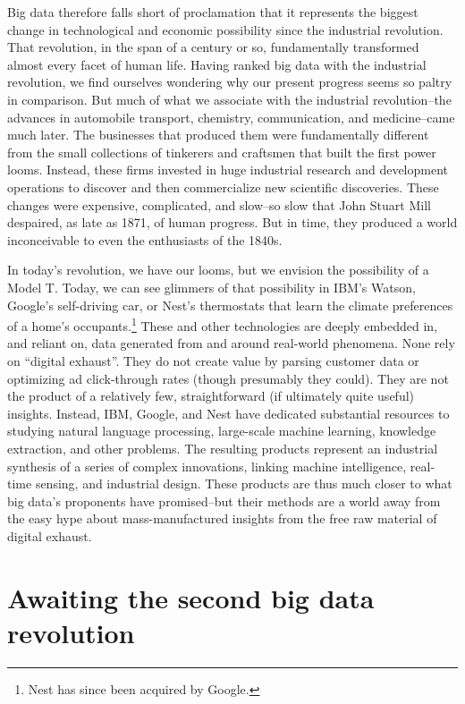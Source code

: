 \documentclass[12pt]{article}
\begin{document}
Big data therefore falls short of proclamation that it represents the
biggest change in technological and economic possibility since the
industrial revolution. That revolution, in the span of a century or
so, fundamentally transformed almost every facet of human life. Having
ranked big data with the industrial revolution, we find ourselves
wondering why our present progress seems so paltry in comparison. But
much of what we associate with the industrial revolution--the advances
in automobile transport, chemistry, communication, and medicine--came
much later. The businesses that produced them were fundamentally
different from the small collections of tinkerers and craftsmen that
built the first power looms. Instead, these firms invested in huge
industrial research and development operations to discover and then
commercialize new scientific discoveries. These changes were
expensive, complicated, and slow--so slow that John Stuart Mill
despaired, as late as 1871, of human progress. But in time, they
produced a world inconceivable to even the enthusiasts of the 1840s.

In today's revolution, we have our looms, but we envision the
possibility of a Model T. Today, we can see glimmers of that
possibility in IBM's Watson, Google's self-driving car, or Nest's
thermostats that learn the climate preferences of a home's
occupants.\footnote{Nest has since been acquired by Google.} These and
other technologies are deeply embedded in, and reliant on, data
generated from and around real-world phenomena. None rely on ``digital
exhaust''. They do not create value by parsing customer data or
optimizing ad click-through rates (though presumably they could). They
are not the product of a relatively few, straightforward (if
ultimately quite useful) insights. Instead, IBM, Google, and Nest have
dedicated substantial resources to studying natural language
processing, large-scale machine learning, knowledge extraction, and
other problems. The resulting products represent an industrial
synthesis of a series of complex innovations, linking machine
intelligence, real-time sensing, and industrial design. These products
are thus much closer to what big data's proponents have promised--but
their methods are a world away from the easy hype about
mass-manufactured insights from the free raw material of digital
exhaust.


\section{Awaiting the second big data revolution}
\label{sec:awaiting-big-data}
\end{document}
